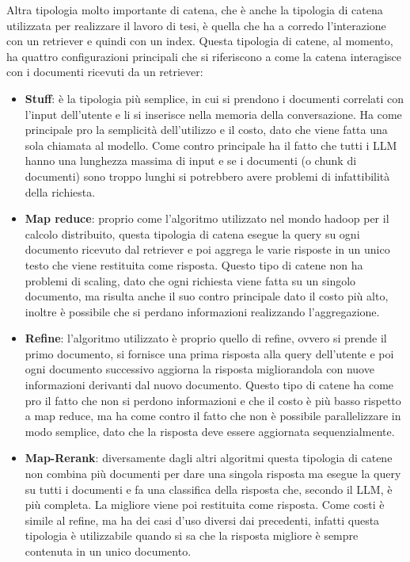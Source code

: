 Altra tipologia molto importante di catena, che è anche la tipologia di catena utilizzata per realizzare il lavoro di tesi, è quella che ha a corredo l'interazione con un retriever e quindi con un index.
Questa tipologia di catene, al momento, ha quattro configurazioni principali che si riferiscono a come la catena interagisce con i documenti ricevuti da un retriever:
\begin{itemize}
    \item \textbf{Stuff}: è la tipologia più semplice, in cui si prendono i documenti correlati con l'input dell'utente e li si inserisce nella memoria della conversazione. Ha come principale pro la semplicità dell'utilizzo e il costo, dato che viene fatta una sola chiamata al modello.
    Come contro principale ha il fatto che tutti i LLM hanno una lunghezza massima di input e se i documenti (o chunk di documenti) sono troppo lunghi si potrebbero avere problemi di infattibilità della richiesta. 
    \item \textbf{Map reduce}: proprio come l'algoritmo utilizzato nel mondo hadoop per il calcolo distribuito, questa tipologia di catena esegue la query su ogni documento ricevuto dal retriever e poi aggrega le varie risposte in un unico testo che viene restituita come risposta.
    Questo tipo di catene non ha problemi di scaling, dato che ogni richiesta viene fatta su un singolo documento, ma risulta anche il suo contro principale dato il costo più alto, inoltre è possibile che si perdano informazioni realizzando l'aggregazione.
    \item \textbf{Refine}: l'algoritmo utilizzato è proprio quello di refine, ovvero si prende il primo documento, si fornisce una prima risposta alla query dell'utente e poi ogni documento successivo aggiorna la risposta migliorandola con nuove informazioni derivanti dal nuovo documento.
    Questo tipo di catene ha come pro il fatto che non si perdono informazioni e che il costo è più basso rispetto a map reduce, ma ha come contro il fatto che non è possibile parallelizzare in modo semplice, dato che la risposta deve essere aggiornata sequenzialmente.
    \item \textbf{Map-Rerank}: diversamente dagli altri algoritmi questa tipologia di catene non combina più documenti per dare una singola risposta ma esegue la query su tutti i documenti e fa una classifica della risposta che, secondo il LLM, è più completa. La migliore viene poi restituita come risposta.
    Come costi è simile al refine, ma ha dei casi d'uso diversi dai precedenti, infatti questa tipologia è utilizzabile quando si sa che la risposta migliore è sempre contenuta in un unico documento. 
\end{itemize}

